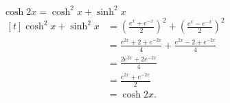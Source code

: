 {$\cosh 2x = \cosh^2x+\sinh^2x$}
{\hfill$\begin{aligned}[t]
		\cosh^2x+\sinh^2x &= \left(\frac{e^x+e^{-x}}{2}\right)^2 + \left(\frac{e^x-e^{-x}}{2}\right)^2 \\
											&= \frac{e^{2x} + 2 + e^{-2x}}{4} + \frac{e^{2x} - 2 + e^{-2x}}{4}\\
											&= \frac{2e^{2x}  + 2e^{-2x}}{4}\\
											&= \frac{e^{2x} + e^{-2x}}{2} \\
											&= \cosh 2x.			
\end{aligned}$\hfill\null}
